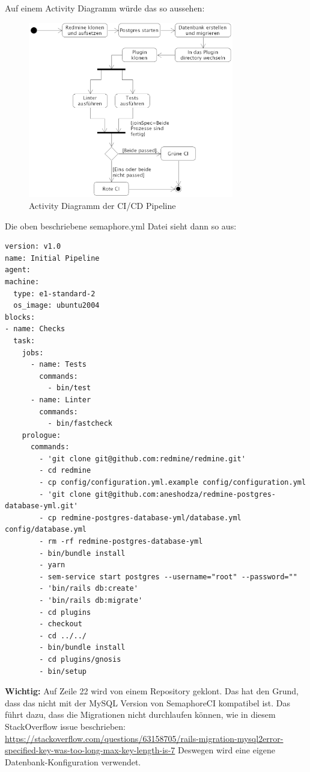 Auf einem Activity Diagramm würde das so aussehen:
\begin{figure}[H]
  \centering
  \includegraphics[width=0.8\textwidth]{images/activity/ci-cd.png}
  \caption[Activity Diagramm der CI/CD Pipeline]{Activity Diagramm der CI/CD Pipeline}
  \label{fig:activity_ci_cd}
\end{figure}

\newpage
Die oben beschriebene semaphore.yml Datei sieht dann so aus:
\begin{codebox}[]
  \begin{verbatim}
version: v1.0
name: Initial Pipeline
agent:
machine:
  type: e1-standard-2
  os_image: ubuntu2004
blocks:
- name: Checks
  task:
    jobs:
      - name: Tests
        commands:
          - bin/test
      - name: Linter
        commands:
          - bin/fastcheck
    prologue:
      commands:
        - 'git clone git@github.com:redmine/redmine.git'
        - cd redmine
        - cp config/configuration.yml.example config/configuration.yml
        - 'git clone git@github.com:aneshodza/redmine-postgres-database-yml.git'
        - cp redmine-postgres-database-yml/database.yml config/database.yml
        - rm -rf redmine-postgres-database-yml
        - bin/bundle install
        - yarn
        - sem-service start postgres --username="root" --password=""
        - 'bin/rails db:create'
        - 'bin/rails db:migrate'
        - cd plugins
        - checkout
        - cd ../../
        - bin/bundle install
        - cd plugins/gnosis
        - bin/setup
  \end{verbatim}
\end{codebox}
\textbf{Wichtig:} Auf Zeile 22 wird von einem Repository geklont. Das hat den Grund, dass das
 nicht mit der MySQL Version von SemaphoreCI kompatibel ist. Das führt dazu,
dass die Migrationen nicht durchlaufen können, wie in diesem StackOverflow issue beschrieben: \newline
\url{https://stackoverflow.com/questions/63158705/rails-migration-mysql2error-specified-key-was-too-long-max-key-length-is-7}
\newline
Deswegen wird eine eigene Datenbank-Konfiguration verwendet.

